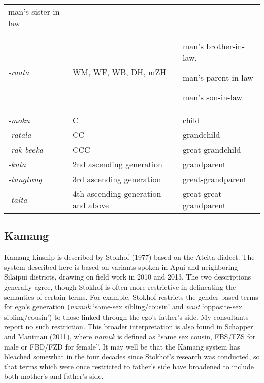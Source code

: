 \begin{center}
\begin{supertabular}{m{1.1490599in}m{2.4587598in}m{2.18796in}}
man{\textquoteright}s sister-in-law\\
\textit{{}-raata} &
WM, WF, WB, DH, mZH &
man{\textquoteright}s brother-in-law, 

man{\textquoteright}s parent-in-law

man{\textquoteright}s son-in-law\\
\textit{{}-moku} &
C &
child\\
\textit{{}-ratala} &
CC &
grandchild\\
\textit{{}-rak beeka} &
CCC &
great-grandchild\\
\textit{{}-kuta} &
2nd ascending generation &
grandparent\\
\textit{{}-tungtung} &
3rd ascending generation &
great-grandparent\\
\textit{{}-taita} &
4th ascending generation and above &
great-great-grandparent\\
\end{supertabular}
\end{center}
\subsection[Kamang]{Kamang}
\hypertarget{RefHeading78029871885726}{}Kamang kinship is described by Stokhof (1977) based on the Ateita dialect. The system described here is based on variants spoken in Apui and neighboring Silaipui districts, drawing on field work in 2010 and 2013. The two descriptions generally agree, though Stokhof is often more restrictive in delineating the semantics of certain terms. For example, Stokhof restricts the gender-based terms for ego{\textquoteright}s generation (\textit{namuk }{\textquoteleft}same-sex sibling/cousin{\textquoteright} and \textit{naut }{\textquoteleft}opposite-sex sibling/cousin{\textquoteright}) to those linked through the ego{\textquoteright}s father{\textquoteright}s side. My consultants report no such restriction. This broader interpretation is also found in Schapper and Manimau (2011), where \textit{namuk }is defined as {\textquotedblleft}same sex cousin, FBS/FZS for male or FBD/FZD for female{\textquotedblright}. It may well be that the Kamang system has bleached somewhat in the four 
decades since Stokhof{\textquoteright}s research was conducted, so that terms which were once restricted to father{\textquoteright}s side have broadened to include both mother{\textquoteright}s and father{\textquoteright}s side.

